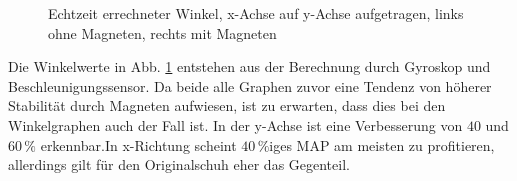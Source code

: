 \begin{figure}[tb]
\begin{adjustwidth}{-0.2\linewidth}{-0.2\linewidth}
\begin{subfigure}[c]{.45\linewidth}
			\vspace{5pt}
		\end{subfigure}
	\end{adjustwidth}
	\caption{Echtzeit errechneter Winkel, x-Achse auf y-Achse aufgetragen, links ohne Magneten, rechts mit Magneten} \label{Angle}
\end{figure}
Die Winkelwerte in Abb. \ref{Angle} entstehen aus der Berechnung durch Gyroskop und Beschleunigungssensor. Da beide alle Graphen zuvor eine Tendenz von höherer Stabilität durch Magneten aufwiesen, ist zu erwarten, dass dies bei den Winkelgraphen auch der Fall ist. In der y-Achse ist eine Verbesserung von $40$ und $60\,\%$ erkennbar.In x-Richtung scheint $40\,\%$iges MAP am meisten zu profitieren, allerdings gilt für den Originalschuh eher das Gegenteil. 

